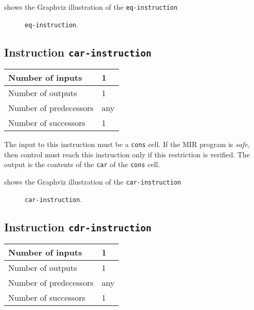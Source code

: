  shows the Graphviz illustration of the
\texttt{eq-instruction}

\begin{figure}
\begin{center}
\end{center}
\caption{\label{fig-eq-instruction}
\texttt{eq-instruction}.}
\end{figure}

\subsection{Instruction \texttt{car-instruction}}
\label{mir-instruction-car}

\begin{tabular}{|l|l|}
\hline
Number of inputs & 1\\
\hline
Number of outputs & 1\\
\hline
Number of predecessors & any\\
\hline
Number of successors & 1\\
\hline
\end{tabular}

The input to this instruction must be a \texttt{cons} cell.  If the
MIR program is \emph{safe}, then control must reach this instruction
only if this restriction is verified.  The output is the contents of
the \texttt{car} of the \texttt{cons} cell.

 shows the Graphviz illustration of the
\texttt{car-instruction}

\begin{figure}
\begin{center}
\end{center}
\caption{\label{fig-car-instruction}
\texttt{car-instruction}.}
\end{figure}

\subsection{Instruction \texttt{cdr-instruction}}
\label{mir-instruction-cdr}

\begin{tabular}{|l|l|}
\hline
Number of inputs & 1\\
\hline
Number of outputs & 1\\
\hline
Number of predecessors & any\\
\hline
Number of successors & 1\\
\hline
\end{tabular}

